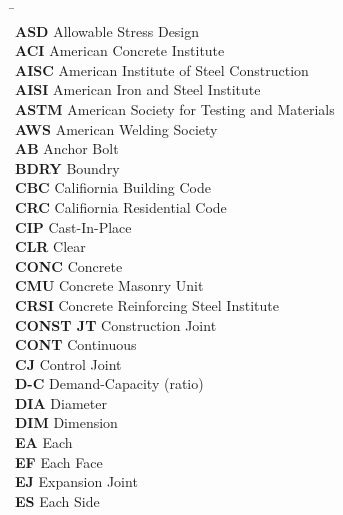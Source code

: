 \setlength{\parindent}{0.2in}
\begin{tabbing}
\hspace*{4cm} \= \kill
    \indent\textbf{}         \>  {}\\
    \indent\textbf{ASD}      \>  {Allowable Stress Design}\\
    \indent\textbf{ACI}      \>  {American Concrete Institute}\\
    \indent\textbf{AISC}     \>  {American Institute of Steel Construction}\\
    \indent\textbf{AISI}     \>  {American Iron and Steel Institute}\\
    \indent\textbf{ASTM}     \>  {American Society for Testing and Materials}\\
    \indent\textbf{AWS}      \>  {American Welding Society}\\
    \indent\textbf{AB}       \>  {Anchor Bolt}\\
    \indent\textbf{BDRY}     \>  {Boundry}\\
    \indent\textbf{CBC}      \>  {Califiornia Building Code}\\
    \indent\textbf{CRC}      \>  {Califiornia Residential Code}\\
    \indent\textbf{CIP}      \>  {Cast-In-Place}\\
    \indent\textbf{CLR}      \>  {Clear}\\
    \indent\textbf{CONC}     \>  {Concrete}\\
    \indent\textbf{CMU}      \>  {Concrete Masonry Unit}\\
    \indent\textbf{CRSI}     \>  {Concrete Reinforcing Steel Institute}\\
    \indent\textbf{CONST JT} \>  {Construction Joint}\\
    \indent\textbf{CONT}     \>  {Continuous}\\
    \indent\textbf{CJ}       \>  {Control Joint}\\
    \indent\textbf{D-C}      \>  {Demand-Capacity (ratio)}\\
    \indent\textbf{DIA}      \>  {Diameter}\\
    \indent\textbf{DIM}      \>  {Dimension}\\
    \indent\textbf{EA}       \>  {Each}\\
    \indent\textbf{EF}       \>  {Each Face}\\
    \indent\textbf{EJ}       \>  {Expansion Joint}\\
    \indent\textbf{ES}       \>  {Each Side}\\

\end{tabbing}
